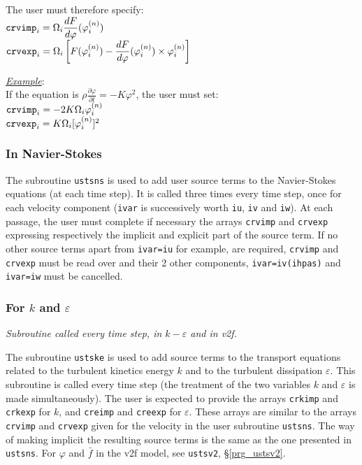 {{{The user must therefore specify:\\
$\displaystyle\text{\texttt{crvimp}}_i=\Omega_i\frac{dF}{d\varphi}(\varphi_i^{(n)})$\\
$\displaystyle\text{\texttt{crvexp}}_i=
\Omega_i\left[F(\varphi_i^{(n)})-\frac{dF}{d\varphi}(\varphi_i^{(n)})\times\varphi_i^{(n)}\right]$

\underline{\em Example}:\\
If the equation is
$\displaystyle \rho\frac{\partial\varphi}{\partial t}=-K\varphi^2$,
the user must set:\\
$\text{\texttt{crvimp}}_i=-2K\Omega_i\varphi_i^{(n)}$\\
$\text{\texttt{crvexp}}_i=K\Omega_i[\varphi_i^{(n)}]^2$

\subsubsection{In Navier-Stokes}

The subroutine \texttt{ustsns} is used to add user source terms to the Navier-Stokes
equations (at each time step). It is called three times every time
step, once for each velocity component (\texttt{ivar} is successively worth
\texttt{iu}, \texttt{iv} and \texttt{iw}).
At each passage, the user must complete if necessary the arrays \texttt{crvimp}
and \texttt{crvexp} expressing respectively the implicit and explicit part of
the source term. If no other source terms apart from \texttt{ivar=iu} for
example, are required, \texttt{crvimp} and \texttt{crvexp} must be read over and
their 2 other components, \texttt{ivar=iv(ihpas)} and \texttt{ivar=iw}
must be cancelled.

\subsubsection{For $k$ and $\varepsilon$}

\noindent
\textit{Subroutine called every time step, in $k-\varepsilon$ and
in v2f.}

The subroutine \texttt{ustske} is used to add source terms to the transport equations
related to the turbulent kinetics energy $k$ and to the turbulent
dissipation $\varepsilon$.
This subroutine is called every time step (the
treatment of the two variables $k$ and $\varepsilon$ is made
simultaneously). The user is expected to provide the arrays \texttt{crkimp} and
\texttt{crkexp} for $k$, and \texttt{creimp} and \texttt{creexp} for
$\varepsilon$. These arrays are similar to the arrays \texttt{crvimp} and
\texttt{crvexp} given for the velocity in the user subroutine \texttt{ustsns}.
The way of making implicit the resulting source terms is the same as the one
presented in \texttt{ustsns}. For $\varphi$ and $\bar{f}$
in the v2f model, see \texttt{ustsv2}, \S\ref{prg_ustsv2}.

}}}
